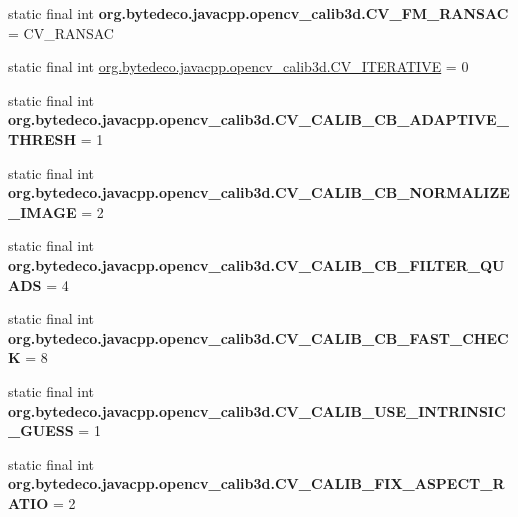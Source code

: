 \begin{DoxyCompactItemize}
static final int {\bfseries org.\+bytedeco.\+javacpp.\+opencv\+\_\+calib3d.\+C\+V\+\_\+\+F\+M\+\_\+\+R\+A\+N\+S\+AC} = C\+V\+\_\+\+R\+A\+N\+S\+AC
\item 
static final int \hyperlink{group__calib3d__c_ga7bd331d354ffd666d56f3fdfc5937e91}{org.\+bytedeco.\+javacpp.\+opencv\+\_\+calib3d.\+C\+V\+\_\+\+I\+T\+E\+R\+A\+T\+I\+VE} = 0
\item 
\mbox{\label{group__calib3d__c_gaf6fd23dd03607669e5656cb895a62a2a}} 
static final int {\bfseries org.\+bytedeco.\+javacpp.\+opencv\+\_\+calib3d.\+C\+V\+\_\+\+C\+A\+L\+I\+B\+\_\+\+C\+B\+\_\+\+A\+D\+A\+P\+T\+I\+V\+E\+\_\+\+T\+H\+R\+E\+SH} = 1
\item 
\mbox{\label{group__calib3d__c_gac4eb816f4d82ebbffd95020452d6db4d}} 
static final int {\bfseries org.\+bytedeco.\+javacpp.\+opencv\+\_\+calib3d.\+C\+V\+\_\+\+C\+A\+L\+I\+B\+\_\+\+C\+B\+\_\+\+N\+O\+R\+M\+A\+L\+I\+Z\+E\+\_\+\+I\+M\+A\+GE} = 2
\item 
\mbox{\label{group__calib3d__c_gadff7a74b9ef477bc1941b6308b311d75}} 
static final int {\bfseries org.\+bytedeco.\+javacpp.\+opencv\+\_\+calib3d.\+C\+V\+\_\+\+C\+A\+L\+I\+B\+\_\+\+C\+B\+\_\+\+F\+I\+L\+T\+E\+R\+\_\+\+Q\+U\+A\+DS} = 4
\item 
\mbox{\label{group__calib3d__c_gafb97429133a16ebe75dd49fd00c674d6}} 
static final int {\bfseries org.\+bytedeco.\+javacpp.\+opencv\+\_\+calib3d.\+C\+V\+\_\+\+C\+A\+L\+I\+B\+\_\+\+C\+B\+\_\+\+F\+A\+S\+T\+\_\+\+C\+H\+E\+CK} = 8
\item 
\mbox{\label{group__calib3d__c_gacdb42162ca5efa2580438731f6507a54}} 
static final int {\bfseries org.\+bytedeco.\+javacpp.\+opencv\+\_\+calib3d.\+C\+V\+\_\+\+C\+A\+L\+I\+B\+\_\+\+U\+S\+E\+\_\+\+I\+N\+T\+R\+I\+N\+S\+I\+C\+\_\+\+G\+U\+E\+SS} = 1
\item 
\mbox{\label{group__calib3d__c_ga470b47d94e8c174c01e150abf1086b6b}} 
static final int {\bfseries org.\+bytedeco.\+javacpp.\+opencv\+\_\+calib3d.\+C\+V\+\_\+\+C\+A\+L\+I\+B\+\_\+\+F\+I\+X\+\_\+\+A\+S\+P\+E\+C\+T\+\_\+\+R\+A\+T\+IO} = 2
\item 
\mbox{\label{group__calib3d__c_ga870a45cea846fe6839f73dfa9b86654d}} 

\end{DoxyCompactItemize}
